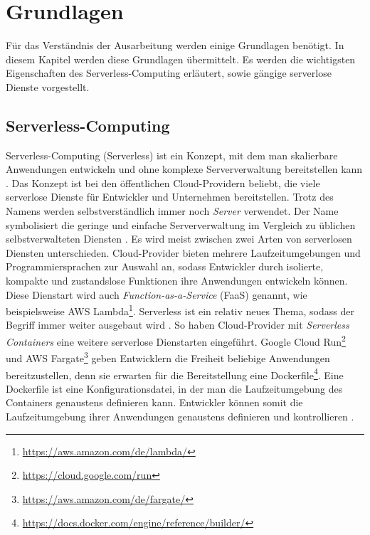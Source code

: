 \chapter{Grundlagen}
Für das Verständnis der Ausarbeitung werden einige Grundlagen benötigt.
In diesem Kapitel werden diese Grundlagen übermittelt.
Es werden die wichtigsten Eigenschaften des Serverless-Computing erläutert,
sowie gängige serverlose Dienste vorgestellt.

\section{Serverless-Computing}
Serverless-Computing (Serverless) ist ein Konzept, mit dem man skalierbare Anwendungen
entwickeln und ohne komplexe Serververwaltung bereitstellen kann \cite{CioGov}.
Das Konzept ist bei den öffentlichen Cloud-Providern beliebt, die viele
serverlose Dienste für Entwickler und Unternehmen bereitstellen. Trotz des Namens
werden selbstverständlich immer noch \textit{Server} verwendet. Der Name symbolisiert die geringe
und einfache Serververwaltung im Vergleich zu üblichen selbstverwalteten
Diensten \cite{CNCF}. Es wird meist zwischen zwei Arten von
serverlosen Diensten unterschieden. Cloud-Provider bieten mehrere
Laufzeitumgebungen und Programmiersprachen zur Auswahl an,
sodass Entwickler durch isolierte, kompakte und zustandslose Funktionen
ihre Anwendungen entwickeln können. Diese Dienstart wird auch
\textit{Function-as-a-Service} (FaaS) genannt, wie beispielsweise
AWS Lambda\footnote{\url{https://aws.amazon.com/de/lambda/}}.
Serverless ist ein relativ neues Thema, sodass
der Begriff immer weiter ausgebaut wird \cite{ServerlessTrends}.
So haben Cloud-Provider mit \textit{Serverless Containers}
eine weitere serverlose Dienstarten eingeführt.
Google Cloud Run\footnote{\url{https://cloud.google.com/run}} und
AWS Fargate\footnote{\url{https://aws.amazon.com/de/fargate/}} geben Entwicklern
die Freiheit beliebige Anwendungen bereitzustellen,
denn sie erwarten für die Bereitstellung eine
Dockerfile\footnote{\url{https://docs.docker.com/engine/reference/builder/}}.
Eine Dockerfile ist eine Konfigurationsdatei, in der man die
Laufzeitumgebung des Containers genaustens definieren kann.
Entwickler können somit die Laufzeitumgebung ihrer Anwendungen
genaustens definieren und kontrollieren \cite{ServerlessTrends}.

